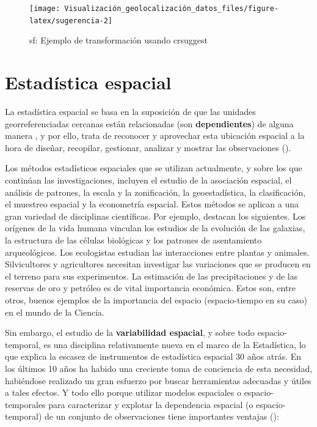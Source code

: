 \documentclass[
]{book}
\theoremstyle{definition}
\theoremstyle{definition}
\theoremstyle{definition}
\theoremstyle{definition}
\theoremstyle{remark}
\begin{document}
\begin{figure}

{\centering \texttt{[image: Visualización\_geolocalización\_datos\_files/figure-latex/sugerencia-2]} 

}

\caption{sf: Ejemplo de transformación usando crsuggest}\label{fig:sugerencia-2}
\end{figure}

\hypertarget{dep-esp}{%
\chapter{Estadística espacial}\label{dep-esp}}

La estadística espacial se basa en la suposición de que las unidades
georreferenciadas cercanas están relacionadas (son \textbf{dependientes}) de alguna
manera \citep{getis_1999}, y por ello, trata de reconocer y aprovechar esta ubicación
espacial a la hora de diseñar, recopilar, gestionar, analizar y mostrar las
observaciones (\citet{montero_et_al_2011}).

Los métodos estadísticos espaciales que se utilizan actualmente, y sobre los que
continúan las investigaciones, incluyen el estudio de la asociación espacial, el
análisis de patrones, la escala y la zonificación, la geoestadística, la
clasificación, el muestreo espacial y la econometría espacial. Estos métodos se
aplican a una gran variedad de disciplinas científicas. Por ejemplo,
\citet{montero_et_al_2011} destacan los siguientes. Los orígenes de la vida humana
vinculan los estudios de la evolución de las galaxias, la estructura de las
células biológicas y los patrones de asentamiento arqueológicos. Los ecologistas
estudian las interacciones entre plantas y animales. Silvicultores y
agricultores necesitan investigar las variaciones que se producen en el terreno
para sus experimentos. La estimación de las precipitaciones y de las reservas de
oro y petróleo es de vital importancia económica. Estos son, entre otros, buenos
ejemplos de la importancia del espacio (espacio-tiempo en su caso) en el mundo
de la Ciencia.

Sin embargo, el estudio de la \textbf{variabilidad espacial}, y sobre todo
espacio-temporal, es una disciplina relativamente nueva en el marco de la
Estadística, lo que explica la escasez de instrumentos de estadística espacial
30 años atrás. En los últimos 10 años ha habido una creciente toma de conciencia
de esta necesidad, habiéndose realizado un gran esfuerzo por buscar herramientas
adecuadas y útiles a tales efectos. Y todo ello porque utilizar modelos
espaciales o espacio-temporales para caracterizar y explotar la dependencia
espacial (o espacio-temporal) de un conjunto de observaciones tiene importantes
ventajas (\citet{montero_et_al_2011}):
\end{document}
